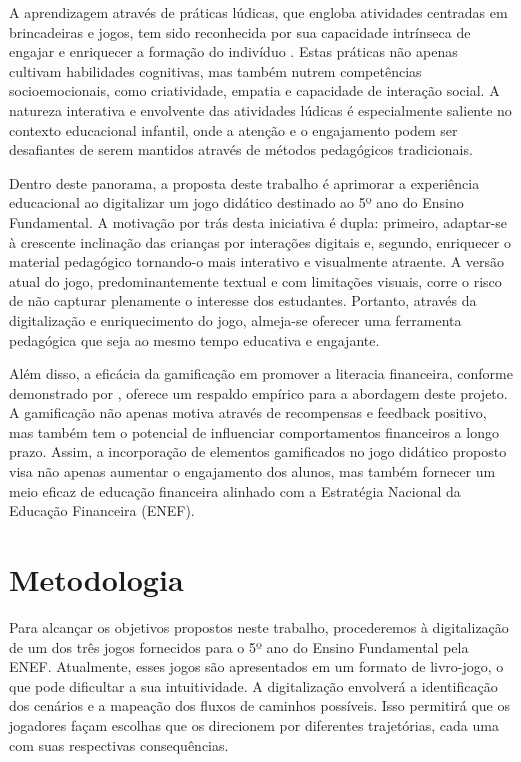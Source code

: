 A aprendizagem através de práticas lúdicas, que engloba atividades centradas em brincadeiras e jogos, tem sido reconhecida por sua capacidade intrínseca de engajar e enriquecer a formação do indivíduo \cite{Santos_Thayna_da_silva_2021}. Estas práticas não apenas cultivam habilidades cognitivas, mas também nutrem competências socioemocionais, como criatividade, empatia e capacidade de interação social. A natureza interativa e envolvente das atividades lúdicas é especialmente saliente no contexto educacional infantil, onde a atenção e o engajamento podem ser desafiantes de serem mantidos através de métodos pedagógicos tradicionais.

Dentro deste panorama, a proposta deste trabalho é aprimorar a experiência educacional ao digitalizar um jogo didático destinado ao 5º ano do Ensino Fundamental. A motivação por trás desta iniciativa é dupla: primeiro, adaptar-se à crescente inclinação das crianças por interações digitais e, segundo, enriquecer o material pedagógico tornando-o mais interativo e visualmente atraente. A versão atual do jogo, predominantemente textual e com limitações visuais, corre o risco de não capturar plenamente o interesse dos estudantes. Portanto, através da digitalização e enriquecimento do jogo, almeja-se oferecer uma ferramenta pedagógica que seja ao mesmo tempo educativa e engajante.

Além disso, a eficácia da gamificação em promover a literacia financeira, conforme demonstrado por \cite{inchamnan2019gamification}, oferece um respaldo empírico para a abordagem deste projeto. A gamificação não apenas motiva através de recompensas e feedback positivo, mas também tem o potencial de influenciar comportamentos financeiros a longo prazo. Assim, a incorporação de elementos gamificados no jogo didático proposto visa não apenas aumentar o engajamento dos alunos, mas também fornecer um meio eficaz de educação financeira alinhado com a Estratégia Nacional da Educação Financeira (ENEF).


\section{Metodologia}

Para alcançar os objetivos propostos neste trabalho, procederemos à digitalização de um dos três jogos fornecidos para o 5º ano do Ensino Fundamental pela ENEF. Atualmente, esses jogos são apresentados em um formato de livro-jogo, o que pode dificultar a sua intuitividade. A digitalização envolverá a identificação dos cenários e a mapeação dos fluxos de caminhos possíveis. Isso permitirá que os jogadores façam escolhas que os direcionem por diferentes trajetórias, cada uma com suas respectivas consequências.

